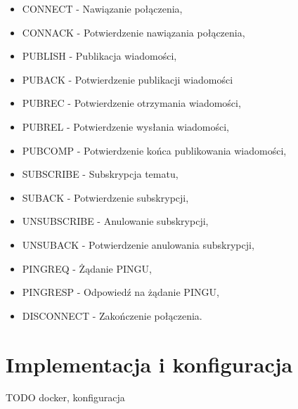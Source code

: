         \begin{itemize}
            \item CONNECT - Nawiązanie połączenia,
            \item CONNACK - Potwierdzenie nawiązania połączenia,
            \item PUBLISH - Publikacja wiadomości,
            \item PUBACK - Potwierdzenie publikacji wiadomości
            \item PUBREC - Potwierdzenie otrzymania wiadomości,
            \item PUBREL - Potwierdzenie wysłania wiadomości,
            \item PUBCOMP - Potwierdzenie końca publikowania wiadomości,
            \item SUBSCRIBE - Subskrypcja tematu,
            \item SUBACK - Potwierdzenie subskrypcji,
            \item UNSUBSCRIBE - Anulowanie subskrypcji,
            \item UNSUBACK - Potwierdzenie anulowania subskrypcji,
            \item PINGREQ - Żądanie PINGU,
            \item PINGRESP - Odpowiedź na żądanie PINGU,
            \item DISCONNECT - Zakończenie połączenia.
        \end{itemize}
        
        
    
    \section{Implementacja i konfiguracja}
      TODO docker, konfiguracja